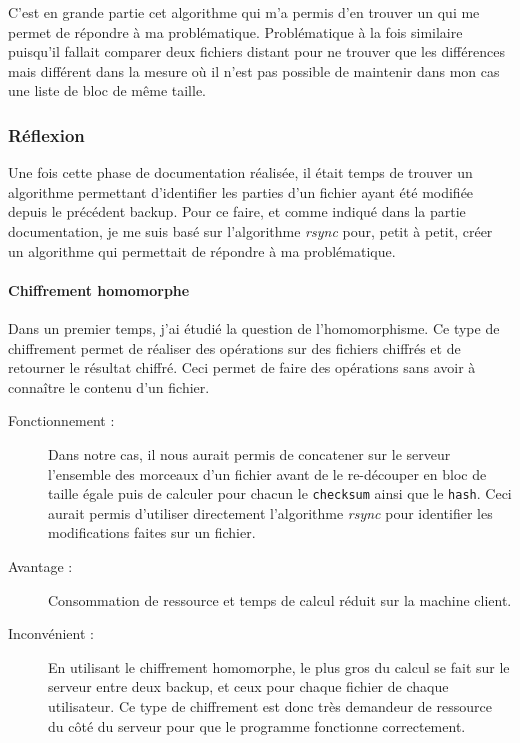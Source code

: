 \documentclass[a4paper,10pt, twoside]{report}
\begin{document}
\begin{spacing}{1.2}
C'est en grande partie cet algorithme qui m'a permis d'en trouver un qui me
permet de r\'epondre \`a ma probl\'ematique. Probl\'ematique \`a la fois
similaire puisqu'il fallait comparer deux fichiers distant pour ne trouver que
les diff\'erences mais diff\'erent dans la mesure o\`u il n'est pas possible
de maintenir dans mon cas une liste de bloc de m\^eme taille.

\subsubsection{R\'eflexion}
Une fois cette phase de documentation r\'ealis\'ee, il \'etait temps de trouver
un algorithme permettant d'identifier les parties d'un fichier ayant \'et\'e
modifi\'ee depuis le pr\'ec\'edent backup. Pour ce faire, et comme indiqu\'e
dans la partie documentation, je me suis bas\'e sur l'algorithme \textit{rsync}
pour, petit \`a petit, cr\'eer un algorithme qui permettait de r\'epondre \`a ma
probl\'ematique.

\paragraph{Chiffrement homomorphe\\}
Dans un premier temps, j'ai \'etudi\'e la question de l'homomorphisme. Ce type
de chiffrement permet de r\'ealiser des op\'erations sur des fichiers chiffr\'es
et de retourner le r\'esultat chiffr\'e. Ceci permet de faire des op\'erations
sans avoir \`a conna\^itre le contenu d'un fichier.

\begin{description}
 \item [Fonctionnement :] Dans notre cas, il nous aurait permis de concatener
 sur le serveur l'ensemble des morceaux d'un fichier avant de le re-d\'ecouper
 en bloc de taille \'egale puis de calculer pour chacun le \texttt{checksum}
 ainsi que le \texttt{hash}. Ceci aurait permis d'utiliser directement
 l'algorithme \textit{rsync} pour identifier les modifications faites sur un
 fichier.

 \item [Avantage :] Consommation de ressource et temps de calcul r\'eduit sur
 la machine client.
 
 \item [Inconv\'enient :] En utilisant le chiffrement homomorphe, le plus gros
 du calcul se fait sur le serveur entre deux backup, et ceux pour chaque
 fichier de chaque utilisateur. Ce type de chiffrement est donc tr\`es
 demandeur de ressource du c\^ot\'e du serveur pour que le programme fonctionne
 correctement.


\end{description}
\end{spacing}
\end{document}
